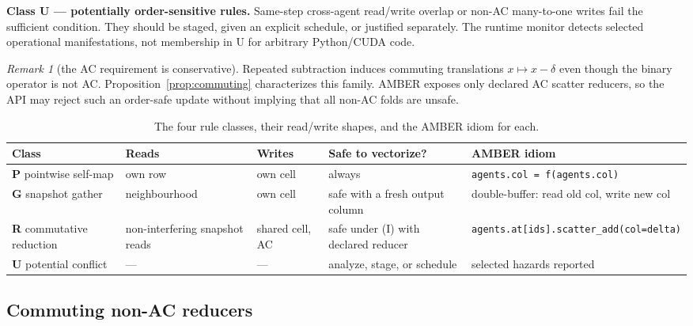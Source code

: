 \documentclass[sigconf,nonacm,review,natbib=true]{acmart}
\theoremstyle{definition}
\theoremstyle{plain}
\theoremstyle{remark}
\newtheorem{remark}{Remark}
\begin{document}
\textbf{Class U --- potentially order-sensitive rules.} Same-step cross-agent
read/write overlap or non-AC many-to-one writes fail the sufficient condition.
They should be staged, given an explicit schedule, or justified separately. The
runtime monitor detects selected operational manifestations, not membership in
U for arbitrary Python/CUDA code.

\begin{remark}[the AC requirement is conservative]\label{rem:ac}
Repeated subtraction induces commuting translations $x\mapsto x-\delta$ even
though the binary operator is not AC. Proposition~\ref{prop:commuting}
characterizes this family. AMBER exposes only declared AC scatter reducers, so
the API may reject such an order-safe update without implying that all non-AC
folds are unsafe.
\end{remark}

\begin{table}[H]
\centering
\small
\setlength{\tabcolsep}{4pt}
\begin{tabularx}{\textwidth}{@{}l l l >{\raggedright\arraybackslash}X >{\raggedright\arraybackslash}X@{}}
\toprule
Class & Reads & Writes & Safe to vectorize? & AMBER idiom \\
\midrule
\textbf{P} pointwise self-map & own row & own cell & always & \texttt{agents.\allowbreak{}col =\allowbreak{} f(\allowbreak{}agents.\allowbreak{}col)\allowbreak{}} \\
\textbf{G} snapshot gather & neighbourhood & own cell & safe with a fresh output column & double-buffer: read old col, write new col \\
\textbf{R} commutative reduction & non-interfering snapshot reads & shared cell, AC & safe under (I) with declared reducer & \texttt{agents.\allowbreak{}at[\allowbreak{}ids]\allowbreak{}.\allowbreak{}scatter\_\allowbreak{}add(\allowbreak{}col=\allowbreak{}delta)\allowbreak{}} \\
\textbf{U} potential conflict & --- & --- & analyze, stage, or schedule & selected hazards reported \\
\bottomrule
\end{tabularx}
\caption{The four rule classes, their read/write shapes, and the AMBER idiom for each.}\label{tab:classes}
\end{table}




\subsection{Commuting non-AC reducers}\label{ax:propA1}
\end{document}

